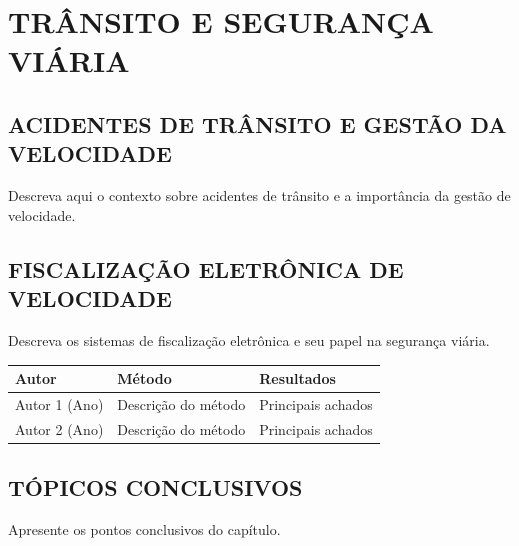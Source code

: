 \chapter{TRÂNSITO E SEGURANÇA VIÁRIA}
\label{capitulo1}

\section{ACIDENTES DE TRÂNSITO E GESTÃO DA VELOCIDADE}

Descreva aqui o contexto sobre acidentes de trânsito e a importância da gestão de velocidade.

\section{FISCALIZAÇÃO ELETRÔNICA DE VELOCIDADE}

Descreva os sistemas de fiscalização eletrônica e seu papel na segurança viária.

\begin{quadro}[htbp]
  \caption{Principais estudos sobre efeitos da fiscalização de velocidade na segurança viária, no âmbito internacional}
  \label{quad:estudos_internacionais}
  \centering
  \small
  \begin{tabular}{|p{4cm}|p{5cm}|p{4cm}|}
    \hline
    \textbf{Autor} & \textbf{Método} & \textbf{Resultados} \\
    \hline
    Autor 1 (Ano) & Descrição do método & Principais achados \\
    \hline
    Autor 2 (Ano) & Descrição do método & Principais achados \\
    \hline
  \end{tabular}
\end{quadro}

\section{TÓPICOS CONCLUSIVOS}

Apresente os pontos conclusivos do capítulo.
